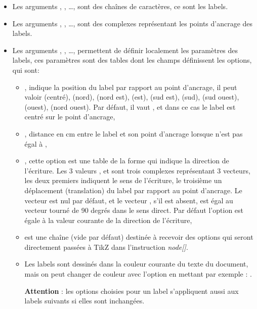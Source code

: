 \begin{itemize}
    \begin{itemize}
    \item Les arguments , , \ldots, sont des chaînes de caractères, ce sont les labels.
    \item Les arguments , , \ldots, sont des complexes représentant les points d'ancrage des labels.
    \item  Les arguments , , \ldots,  permettent de définir localement les paramètres des labels, ces paramètres sont des tables dont les champs définissent les options, qui sont:
        \begin{itemize}
            \item {}, indique la position du label par rapport au point d'ancrage, il peut valoir  (centré),  (nord),  (nord est),  (est),  (sud est),  (sud),  (sud ouest),  (ouest),  (nord ouest). Par défaut, il vaut , et dans ce cas le label est centré sur le point d'ancrage,
            \item {}, distance en cm entre le label et son point d'ancrage lorsque  n'est pas égal à ,
            \item {}, cette option est une table de la forme  qui indique la direction de l'écriture. Les 3 valeurs ,  et  sont trois complexes représentant 3 vecteurs, les deux premiers indiquent le sens de l'écriture, le troisième un déplacement (translation) du label par rapport au point d'ancrage. Le vecteur  est nul par défaut, et le vecteur , s'il est absent, est égal au vecteur  tourné de 90 degrés dans le sens direct.
            Par défaut l'option  est égale à la valeur courante de la direction de l'écriture,
            \item {} est une chaîne (vide par défaut) destinée à recevoir des options qui seront directement passées à TikZ dans l'instruction \emph{node[]}.
            \item Les labels sont dessinés dans la couleur courante du texte du document, mais on peut changer de couleur avec l'option  en mettant par exemple : .
            
            \textbf{Attention} : les options choisies pour un label s'appliquent aussi aux labels suivants si elles sont inchangées.
        \end{itemize}
  \end{itemize}


\end{itemize}
